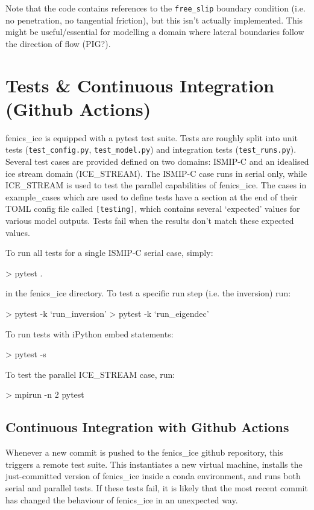 \documentclass[11pt, reqno, nocenter]{article}
\begin{document}
Note that the code contains references to the {\tt free\_slip} boundary condition (i.e. no penetration, no tangential friction), but this isn't actually implemented. This might be useful/essential for modelling a domain where lateral boundaries follow the direction of flow (PIG?).

\section{Tests \& Continuous Integration (Github Actions)} \label{sec:test}

fenics\_ice is equipped with a pytest test suite. Tests are roughly split into unit tests (\texttt{test\_config.py}, \texttt{test\_model.py}) and integration tests (\texttt{test\_runs.py}). Several test cases are provided defined on two domains: ISMIP-C and an idealised ice stream domain (ICE\_STREAM). The ISMIP-C case runs in serial only, while ICE\_STREAM is used to test the parallel capabilities of fenics\_ice. The cases in example\_cases which are used to define tests have a section at the end of their TOML config file called \texttt{[testing]}, which contains several `expected' values for various model outputs. Tests fail when the results don't match these expected values.

To run all tests for a single ISMIP-C serial case, simply:
\begin{spverbatim}
> pytest .
\end{spverbatim}
in the fenics\_ice directory. To test a specific run step (i.e. the inversion) run:

\begin{spverbatim}
> pytest -k `run_inversion'
> pytest -k `run_eigendec'
\end{spverbatim}

To run tests with iPython embed statements:
\begin{spverbatim}
> pytest -s
\end{spverbatim}

To test the parallel ICE\_STREAM case, run:
\begin{spverbatim}
> mpirun -n 2 pytest
\end{spverbatim}

\subsection{Continuous Integration with Github Actions}

Whenever a new commit is pushed to the fenics\_ice github repository, this triggers a remote test suite. This instantiates a new virtual machine, installs the just-committed version of fenics\_ice inside a conda environment, and runs both serial and parallel tests. If these tests fail, it is likely that the most recent commit has changed the behaviour of fenics\_ice in an unexpected way.
\end{document}
